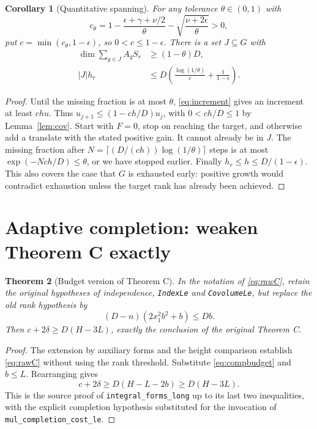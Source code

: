 \documentclass[11pt]{article}
\newtheorem{theorem}{Theorem}[section]
\newtheorem{corollary}[theorem]{Corollary}
\theoremstyle{remark}\newtheorem{remark}[theorem]{Remark}
\begin{document}
\begin{corollary}[Quantitative spanning]\label{cor:span}
For any tolerance $\theta\in(0,1)$ with
\[
c_\theta=1-\frac{\epsilon+\gamma+\nu/2}{\theta}-\sqrt{\frac{\nu+2\epsilon}{\theta}}>0,
\]
put $c=\min(c_\theta,1-\epsilon)$, so $0<c\le1-\epsilon$. There is a set $J\subseteq G$ with
\begin{align*}
\dim\sum_{g\in J} A_g S_r&\ge(1-\theta)D,\\
|J|h_r&\le D\left(\frac{\log(1/\theta)}{c}+\frac1{1-\epsilon}\right).
\end{align*}
\end{corollary}
\begin{proof}
Until the missing fraction is at most $\theta$, \eqref{eq:increment} gives an increment at least $chu$. Thus $u_{j+1}\le(1-ch/D)u_j$, with $0<ch/D\le1$ by Lemma~\ref{lem:cov}. Start with $F=0$, stop on reaching the target, and otherwise add a translate with the stated positive gain. It cannot already be in $J$. The missing fraction after $N=\lceil(D/(ch))\log(1/\theta)\rceil$ steps is at most $\exp(-Nch/D)\le\theta$, or we have stopped earlier. Finally $h_r\le h\le D/(1-\epsilon)$. This also covers the case that $G$ is exhausted early: positive growth would contradict exhaustion unless the target rank has already been achieved.
\end{proof}

\section{Adaptive completion: weaken Theorem C exactly}
\begin{theorem}[Budget version of Theorem C]\label{thm:C}
In the notation of \eqref{eq:rawC}, retain the original hypotheses of independence, \texttt{IndexLe} and \texttt{CovolumeLe}, but replace the old rank hypothesis by
\begin{equation}\label{eq:compbudget}
(D-n)(2x_1^2b^2+b)\le Db.
\end{equation}
Then $c+2\delta\ge D(H-3L)$, exactly the conclusion of the original Theorem C.
\end{theorem}
\begin{proof}
The extension by auxiliary forms and the height comparison establish \eqref{eq:rawC} without using the rank threshold. Substitute \eqref{eq:compbudget} and $b\le L$. Rearranging gives
\[
c+2\delta\ge D(H-L-2b)\ge D(H-3L).
\]
This is the source proof of \texttt{integral\_forms\_long} up to its last two inequalities, with the explicit completion hypothesis substituted for the invocation of \texttt{mul\_completion\_cost\_le}.
\end{proof}
\end{document}
